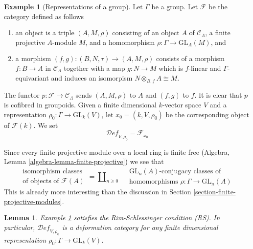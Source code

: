 \documentclass{stacks-project}
\theoremstyle{plain}
\newtheorem{lemma}[subsection]{Lemma}
\theoremstyle{definition}
\newtheorem{example}[subsection]{Example}
\theoremstyle{remark}
\numberwithin{equation}{subsection}
\def\Deformationcategory{\mathcal{D}\!\mathit{ef}}
\begin{document}
\begin{example}[Representations of a group]
\label{example-representations}
Let $\Gamma$ be a group.
Let $\mathcal{F}$ be the category defined as follows
\begin{enumerate}
\item an object is a triple $(A, M, \rho)$ consisting of an
object $A$ of $\mathcal{C}_\Lambda$, a finite projective $A$-module $M$,
and a homomorphism $\rho : \Gamma \to \text{GL}_A(M)$, and
\item a morphism $(f, g) : (B, N, \tau) \to (A, M, \rho)$ consists of
a morphism $f : B \to A$ in $\mathcal{C}_\Lambda$ together
with a map $g : N \to M$ which is $f$-linear and $\Gamma$-equivariant
and induces an isomorpism $N \otimes_{B, f} A \cong M$.
\end{enumerate}
The functor $p : \mathcal{F} \to \mathcal{C}_\Lambda$ sends $(A, M, \rho)$
to $A$ and $(f, g)$ to $f$. It is clear that $p$ is cofibred in groupoids.
Given a finite dimensional $k$-vector space $V$ and a representation
$\rho_0 : \Gamma \to \text{GL}_k(V)$,
let $x_0 = (k, V, \rho_0)$ be the corresponding object of $\mathcal{F}(k)$.
We set
$$
\Deformationcategory_{V, \rho_0} = \mathcal{F}_{x_0}
$$
\end{example}

\noindent
Since every finite projective module over a local ring is finite free
(Algebra, Lemma \ref{algebra-lemma-finite-projective})
we see that
$$
\begin{matrix}
\text{isomorphism classes} \\
\text{of objects of }\mathcal{F}(A)
\end{matrix}
=
\coprod\nolimits_{n \geq 0}\quad
\begin{matrix}
\text{GL}_n(A)\text{-conjugacy classes of}\\
\text{homomorphisms }\rho : \Gamma \to \text{GL}_n(A)
\end{matrix}
$$
This is already more interesting than the discussion in
Section \ref{section-finite-projective-modules}.

\begin{lemma}
\label{lemma-representations-RS}
Example \ref{example-representations}
satisfies the Rim-Schlessinger condition (RS).
In particular, $\Deformationcategory_{V, \rho_0}$ is a deformation category
for any finite dimensional representation
$\rho_0 : \Gamma \to \text{GL}_k(V)$.
\end{lemma}
\end{document}
